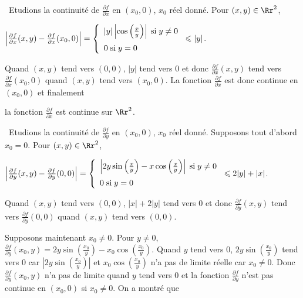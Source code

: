 {{\textbullet~Etudions la continuité de $ \frac{\partial f}{\partial x}$ en $(x_0,0)$, $x_0$ réel donné. Pour $(x,y)\in\Rr^2$,

\begin{center}
$\left| \frac{\partial f}{\partial x}(x,y)- \frac{\partial f}{\partial x}(x_0,0)\right|=\left\{
\begin{array}{l}
|y|\left|\cos\left( \frac{x}{y}\right)\right|\;\text{si}\;y\neq0\\
\rule{0mm}{5mm}0\;\text{si}\;y=0
\end{array}
\right.\leqslant|y|$.
\end{center}

Quand $(x,y)$ tend vers $(0,0)$, $|y|$ tend vers $0$ et donc $ \frac{\partial f}{\partial x}(x,y)$ tend vers $ \frac{\partial f}{\partial x}(x_0,0)$ quand $(x,y)$ tend vers $(x_0,0)$. La fonction $ \frac{\partial f}{\partial x}$ est donc continue en $(x_0,0)$ et finalement

\begin{center}
la fonction $ \frac{\partial f}{\partial x}$ est continue sur $\Rr^2$.
\end{center}

\textbullet~Etudions la continuité de $ \frac{\partial f}{\partial y}$ en $(x_0,0)$, $x_0$ réel donné. Supposons tout d'abord $x_0=0$. Pour $(x,y)\in\Rr^2$,

\begin{center}
$\left| \frac{\partial f}{\partial y}(x,y)- \frac{\partial f}{\partial y}(0,0)\right|=\left\{
\begin{array}{l}
\left|2y\sin\left( \frac{x}{y}\right)-x\cos\left( \frac{x}{y}\right)\right|\;\text{si}\;y\neq0\\
\rule{0mm}{5mm}0\;\text{si}\;y=0
\end{array}
\right.\leqslant2|y|+|x|$.
\end{center}

Quand $(x,y)$ tend vers $(0,0)$, $|x|+2|y|$ tend vers $0$ et donc $ \frac{\partial f}{\partial y}(x,y)$ tend vers $ \frac{\partial f}{\partial y}(0,0)$ quand $(x,y)$ tend vers $(0,0)$. 

Supposons maintenant $x_0\neq0$. Pour $y\neq0$, $ \frac{\partial f}{\partial y}(x_0,y)=2y\sin\left( \frac{x_0}{y}\right)-x_0\cos\left( \frac{x_0}{y}\right)$. Quand $y$ tend vers $0$, $2y\sin\left( \frac{x_0}{y}\right)$ tend vers $0$ car $\left|2y\sin\left( \frac{x_0}{y}\right)\right|$ et $x_0\cos\left( \frac{x_0}{y}\right)$ n'a pas de limite réelle car $x_0\neq0$. Donc $ \frac{\partial f}{\partial y}(x_0,y)$ n'a pas de limite quand $y$ tend vers $0$ et la fonction $ \frac{\partial f}{\partial y}$ n'est pas continue en $(x_0,0)$ si $x_0\neq0$. On a montré que

}}
